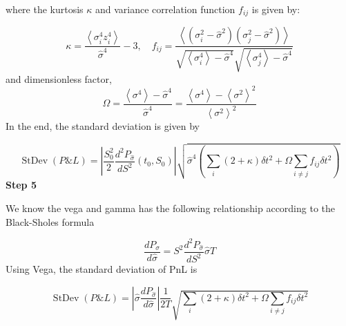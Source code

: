 \documentclass[a4]{article}
\begin{document}
where the kurtosis $\kappa$ and variance correlation function $f_{ij}$ is given by:\par 
\begin{equation}
\kappa=\frac{\left\langle\sigma_{i}^{4} z_{i}^{4}\right\rangle}{\widehat{\sigma}^{4}}-3, \quad f_{i j}=\frac{\left\langle\left(\sigma_{i}^{2}-\widehat{\sigma}^{2}\right)\left(\sigma_{j}^{2}-\widehat{\sigma}^{2}\right)\right\rangle}{\sqrt{\left\langle\sigma_{i}^{4}\right\rangle-\widehat{\sigma}^{4}} \sqrt{\left\langle\sigma_{j}^{4}\right\rangle-\widehat{\sigma}^{4}}}
\end{equation}
and dimensionless factor,
\begin{equation}
\Omega=\frac{\left\langle\sigma^{4}\right\rangle-\widehat{\sigma}^{4}}{\widehat{\sigma}^{4}}=\frac{\left\langle\sigma^{4}\right\rangle-\left\langle\sigma^{2}\right\rangle^{2}}{\left\langle\sigma^{2}\right\rangle^{2}}
\end{equation}
In the end, the standard deviation is given by\par 
\begin{equation}
\operatorname{StDev}(P \& L)=\left|\frac{S_{0}^{2}}{2} \frac{d^{2} P_{\widehat{\sigma}}}{d S^{2}}\left(t_{0}, S_{0}\right)\right| \sqrt{\widehat{\sigma}^{4}\left(\sum_{i}(2+\kappa) \delta t^{2}+\Omega \sum_{i \neq j} f_{i j} \delta t^{2}\right)}
\end{equation}
\bigbreak 
\noindent \textbf{Step 5}\par 
We know the vega and gamma has the following relationship according to the Black-Sholes formula\par 

\begin{equation}
\frac{d P_{\widehat{\sigma}}}{d \widehat{\sigma}}=S^{2} \frac{d^{2} P_{\widehat{\sigma}}}{d S^{2}} \widehat{\sigma} T
\end{equation}
Using Vega, the standard deviation of PnL is \par 
\begin{equation}\label{std_pnl}
\operatorname{StDev}(P \& L)=\left|\widehat{\sigma} \frac{d P_{\widehat{\sigma}}}{d \widehat{\sigma}}\right| \frac{1}{2 T} \sqrt{\sum_{i}(2+\kappa) \delta t^{2}+\Omega \sum_{i \neq j} f_{i j} \delta t^{2}}
\end{equation}
\end{document}
